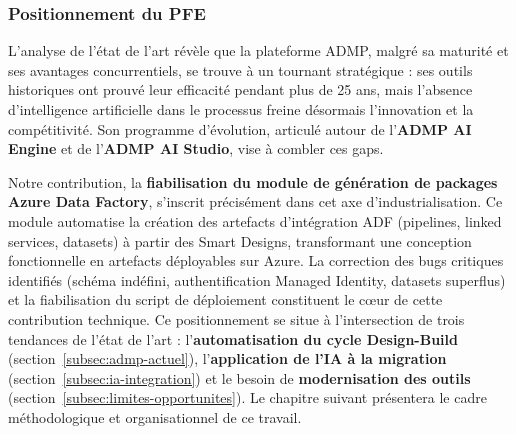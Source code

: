 \subsubsection{Positionnement du PFE}
\label{subsubsec:positionnement-pfe}

L'analyse de l'état de l'art révèle que la plateforme ADMP, malgré sa maturité
et ses avantages concurrentiels, se trouve à un tournant stratégique : ses
outils historiques ont prouvé leur efficacité pendant plus de 25 ans, mais
l'absence d'intelligence artificielle dans le processus freine désormais
l'innovation et la compétitivité. Son programme d'évolution, articulé autour
de l'\textbf{ADMP AI Engine} et de l'\textbf{ADMP AI Studio}, vise à combler
ces gaps.

Notre contribution, la \textbf{fiabilisation du module de génération de packages
Azure Data Factory}, s'inscrit précisément dans cet axe d'industrialisation. Ce
module automatise la création des artefacts d'intégration ADF (pipelines,
linked services, datasets) à partir des Smart Designs, transformant une
conception fonctionnelle en artefacts déployables sur Azure. La correction des
bugs critiques identifiés (schéma indéfini, authentification Managed Identity,
datasets superflus) et la fiabilisation du script de déploiement constituent le
cœur de cette contribution technique. Ce positionnement se situe à
l'intersection de trois tendances de l'état de l'art : l'\textbf{automatisation
du cycle Design-Build} (section~\ref{subsec:admp-actuel}), l'\textbf{application
de l'IA à la migration} (section~\ref{subsec:ia-integration}) et le besoin de
\textbf{modernisation des outils} (section~\ref{subsec:limites-opportunites}).
Le chapitre suivant présentera le cadre méthodologique et organisationnel de ce
travail.